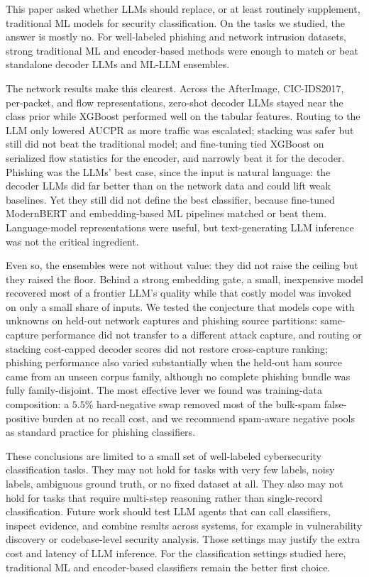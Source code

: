 \documentclass{jmlr}
\begin{document}
This paper asked whether LLMs should replace, or at least routinely supplement, traditional ML models for security classification. On the tasks we studied, the answer is mostly no. For well-labeled phishing and network intrusion datasets, strong traditional ML and encoder-based methods were enough to match or beat standalone decoder LLMs and ML-LLM ensembles.

The network results make this clearest. Across the AfterImage, CIC-IDS2017, per-packet, and flow representations, zero-shot decoder LLMs stayed near the class prior while XGBoost performed well on the tabular features. Routing to the LLM only lowered AUCPR as more traffic was escalated; stacking was safer but still did not beat the traditional model; and fine-tuning tied XGBoost on serialized flow statistics for the encoder, and narrowly beat it for the decoder. Phishing was the LLMs' best case, since the input is natural language: the decoder LLMs did far better than on the network data and could lift weak baselines. Yet they still did not define the best classifier, because fine-tuned ModernBERT and embedding-based ML pipelines matched or beat them. Language-model representations were useful, but text-generating LLM inference was not the critical ingredient.

Even so, the ensembles were not without value: they did not raise the ceiling but they raised the floor. Behind a strong embedding gate, a small, inexpensive model recovered most of a frontier LLM's quality while that costly model was invoked on only a small share of inputs. We tested the conjecture that models cope with unknowns on held-out network captures and phishing source partitions: same-capture performance did not transfer to a different attack capture, and routing or stacking cost-capped decoder scores did not restore cross-capture ranking; phishing performance also varied substantially when the held-out ham source came from an unseen corpus family, although no complete phishing bundle was fully family-disjoint. The most effective lever we found was training-data composition: a $5.5\%$ hard-negative swap removed most of the bulk-spam false-positive burden at no recall cost, and we recommend spam-aware negative pools as standard practice for phishing classifiers.

These conclusions are limited to a small set of well-labeled cybersecurity classification tasks. They may not hold for tasks with very few labels, noisy labels, ambiguous ground truth, or no fixed dataset at all. They also may not hold for tasks that require multi-step reasoning rather than single-record classification. Future work should test LLM agents that can call classifiers, inspect evidence, and combine results across systems, for example in vulnerability discovery or codebase-level security analysis. Those settings may justify the extra cost and latency of LLM inference. For the classification settings studied here, traditional ML and encoder-based classifiers remain the better first choice.


\end{document}
